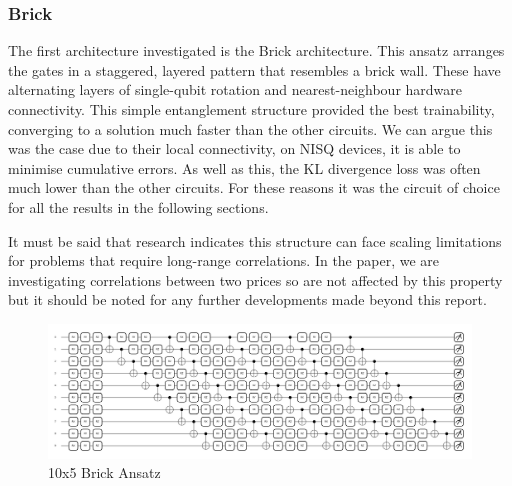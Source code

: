 \documentclass[12pt]{article}
\newcommand{\newp}
    {
    \vskip 0.5cm 
  }
\numberwithin{equation}{section}
\begin{document}
\subsubsection{Brick}
The first architecture investigated is the Brick architecture. This ansatz arranges
the gates in a staggered, layered pattern that resembles a brick wall. These 
have alternating layers of single-qubit rotation and nearest-neighbour hardware
connectivity. This simple
entanglement structure provided the best trainability, converging to a solution 
much faster than the other circuits. We can argue this was the case due to 
their local connectivity, on NISQ devices, it is able to minimise cumulative 
errors. 
As well as this, the KL divergence loss was 
often much lower than the other circuits. For these reasons it was the circuit 
of choice for all the results in the following sections.
\newp 
It must be said that research indicates this structure can face scaling limitations 
for problems that require long-range correlations. In the paper, we are investigating 
correlations between two prices so are not affected by this property but it should 
be noted for any further developments made beyond this report\autocite{wilson_2021_empirical}.


\begin{figure}[h!]
  \centering 
  \includegraphics[width=\linewidth]{ten5brick.png}
  \caption{10x5 Brick Ansatz}
  \label{fig:brick}
\end{figure}
\end{document}
